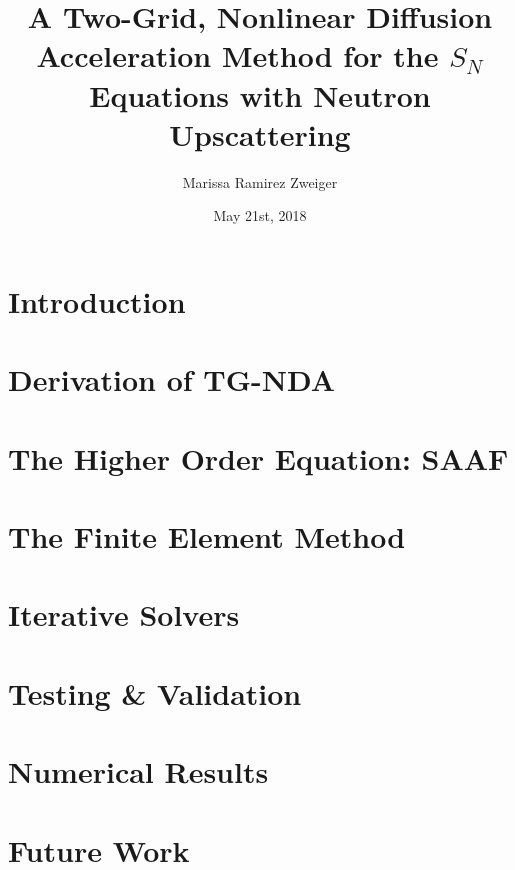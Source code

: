 \documentclass[11pt]{report}
\title{A Two-Grid, Nonlinear Diffusion Acceleration Method for the $S_N$ Equations with Neutron Upscattering}
\author{Marissa Ramirez Zweiger }
\date{May 21st, 2018}
\begin{document}
\maketitle

\tableofcontents

\chapter{Introduction}
\label{sec:intro}


\chapter{Derivation of TG-NDA}
\label{sec:derivation}


\chapter{The Higher Order Equation: SAAF}
\label{sec:ho}


\chapter{The Finite Element Method}
\label{sec:spatial}


\chapter{Iterative Solvers}
\label{sec:iterative}


\chapter{Testing \& Validation}
\label{sec:testing}


\chapter{Numerical Results}
\label{sec:results}


\chapter{Future Work}
\label{sec:future}




\end{document}
